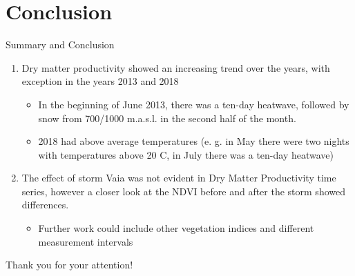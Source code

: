 \documentclass[pdf]{beamer}
\begin{document}
\section{Conclusion}
        \begin{frame}{Summary and Conclusion}
    \begin{enumerate}
 \item Dry matter productivity showed an increasing trend over the years, with exception in the years 2013 and 2018
 \begin{itemize}
     \item In the beginning of June 2013, there was a ten-day heatwave, followed by snow from 700/1000 m.a.s.l. in the second half of the month.
     \item 2018 had above average temperatures (e. g. in May there were two nights with temperatures above 20 \degree C, in July there was a ten-day heatwave)
 \end{itemize}
 \item The effect of storm Vaia was not evident in Dry Matter Productivity time series, however a closer look at the NDVI before and after the storm showed differences.
 \begin{itemize}
     \item Further work could include other vegetation indices and different measurement intervals
 \end{itemize}
 
    \end{enumerate}
\end{frame}
\begin{frame}{}

\begin{center}
\huge{Thank you for your attention!}
\end{center}

\end{frame}
\end{document}
